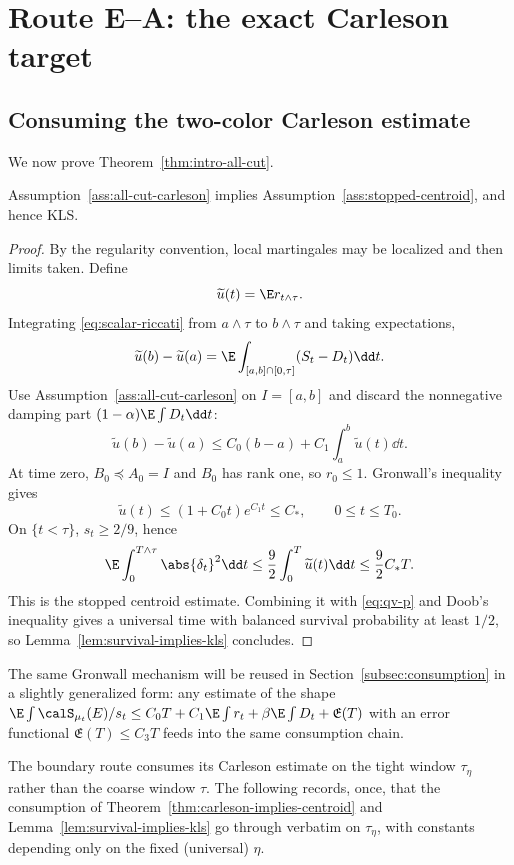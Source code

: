 \documentclass[../../main.tex]{subfiles}
\begin{document}
\section{Route E--A: the exact Carleson target}
\label{sec:carleson}

\subsection{Consuming the two-color Carleson estimate}

We now prove Theorem~\ref{thm:intro-all-cut}.

\begin{theorem}
\label{thm:carleson-implies-centroid}
Assumption~\ref{ass:all-cut-carleson} implies Assumption~\ref{ass:stopped-centroid}, and hence KLS.
\end{theorem}

\begin{proof}
By the regularity convention, local martingales may be localized and then limits taken. Define
\[
  \widetilde u(t)=\E r_{t\wedge\tau}.
\]
Integrating \eqref{eq:scalar-riccati} from $a\wedge\tau$ to $b\wedge\tau$ and taking expectations,
\[
  \widetilde u(b)-\widetilde u(a)
  =\E\int_{[a,b]\cap[0,\tau]}(S_t-D_t)\dd t .
\]
Use Assumption~\ref{ass:all-cut-carleson} on $I=[a,b]$ and discard the nonnegative damping part
$(1-\alpha)\E\int D_t\dd t$:
\[
  \widetilde u(b)-\widetilde u(a)
  \le C_0(b-a)+C_1\int_a^b\widetilde u(t)\dd t .
\]
At time zero, $B_0\preceq A_0=I$ and $B_0$ has rank one, so $r_0\le1$. Gronwall's inequality gives
\[
  \widetilde u(t)\le (1+C_0t)e^{C_1t}\le C_*,
  \qquad 0\le t\le T_0 .
\]
On $\{t<\tau\}$, $s_t\ge2/9$, hence
\[
  \E\int_0^{T\wedge\tau}\abs{\delta_t}^2\dd t
  \le\frac92\int_0^T\widetilde u(t)\dd t
  \le\frac92C_*T .
\]
This is the stopped centroid estimate. Combining it with \eqref{eq:qv-p} and Doob's inequality
gives a universal time with balanced survival probability at least $1/2$, so
Lemma~\ref{lem:survival-implies-kls} concludes.
\end{proof}

The same Gronwall mechanism will be reused in Section~\ref{subsec:consumption} in a slightly
generalized form: any estimate of the shape
$\E\int\calS_{\mu_t}(E)/s_t\le C_0T+C_1\E\int r_t+\beta\E\int D_t+\mathfrak E(T)$ with an error
functional $\mathfrak E(T)\le C_3T$ feeds into the same consumption chain.

The boundary route consumes its Carleson estimate on the tight window $\tau_\eta$ rather than the
coarse window $\tau$. The following records, once, that the consumption of
Theorem~\ref{thm:carleson-implies-centroid} and
Lemma~\ref{lem:survival-implies-kls} go through verbatim on $\tau_\eta$, with constants
depending only on the fixed (universal) $\eta$.
\end{document}
